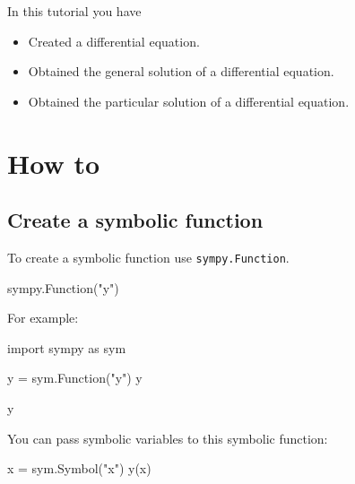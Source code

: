 \begin{note}
In this tutorial you have
\begin{itemize}
\item 

Created a differential equation.

\item 

Obtained the general solution of a differential equation.

\item 

Obtained the particular solution of a differential equation.

\end{itemize}
\end{note}





\section{How to}

\subsection{Create a symbolic function}
\label{\detokenize{tools-for-mathematics/09-differential-equations/how/main:how-to-create-a-symbolic-function}}

To create a symbolic function use \texttt{sympy.Function}.


\begin{api}
sympy.Function("y")
\end{api}



For example:




\begin{pyin}
import sympy as sym

y = sym.Function("y")
y
\end{pyin}





\begin{raw}
y
\end{raw}





You can pass symbolic variables to this symbolic function:




\begin{pyin}
x = sym.Symbol("x")
y(x)
\end{pyin}




